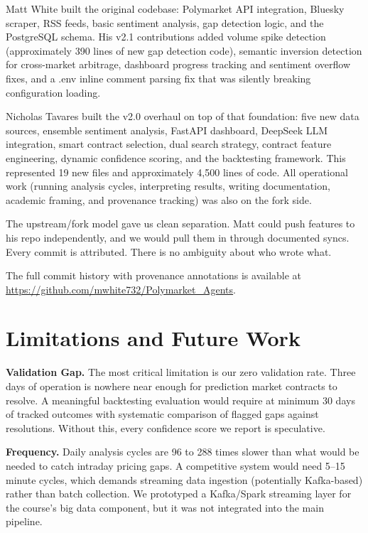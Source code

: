 \documentclass[conference]{IEEEtran}
\begin{document}
Matt White built the original codebase: Polymarket API integration, Bluesky scraper, RSS feeds, basic sentiment analysis, gap detection logic, and the PostgreSQL schema. His v2.1 contributions added volume spike detection (approximately 390 lines of new gap detection code), semantic inversion detection for cross-market arbitrage, dashboard progress tracking and sentiment overflow fixes, and a .env inline comment parsing fix that was silently breaking configuration loading.

Nicholas Tavares built the v2.0 overhaul on top of that foundation: five new data sources, ensemble sentiment analysis, FastAPI dashboard, DeepSeek LLM integration, smart contract selection, dual search strategy, contract feature engineering, dynamic confidence scoring, and the backtesting framework. This represented 19 new files and approximately 4,500 lines of code. All operational work (running analysis cycles, interpreting results, writing documentation, academic framing, and provenance tracking) was also on the fork side.

The upstream/fork model gave us clean separation. Matt could push features to his repo independently, and we would pull them in through documented syncs. Every commit is attributed. There is no ambiguity about who wrote what.

The full commit history with provenance annotations is available at \url{https://github.com/mwhite732/Polymarket_Agents}.

\section{Limitations and Future Work}

\textbf{Validation Gap.} The most critical limitation is our zero validation rate. Three days of operation is nowhere near enough for prediction market contracts to resolve. A meaningful backtesting evaluation would require at minimum 30 days of tracked outcomes with systematic comparison of flagged gaps against resolutions. Without this, every confidence score we report is speculative.

\textbf{Frequency.} Daily analysis cycles are 96 to 288 times slower than what would be needed to catch intraday pricing gaps. A competitive system would need 5--15 minute cycles, which demands streaming data ingestion (potentially Kafka-based) rather than batch collection. We prototyped a Kafka/Spark streaming layer for the course's big data component, but it was not integrated into the main pipeline.
\end{document}

